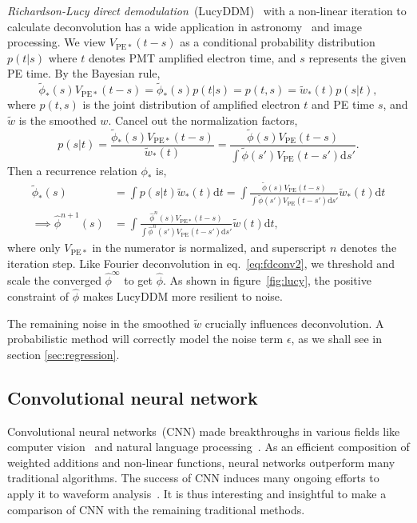 \textit{Richardson-Lucy direct demodulation}~(LucyDDM)~\cite{lucy_iterative_1974} with a non-linear iteration to calculate deconvolution has a wide application in astronomy~\cite{li_richardson-lucy_2019} and image processing. We view $V_{\mathrm{PE}*}(t-s)$ as a conditional probability distribution $p(t|s)$ where $t$ denotes PMT amplified electron time, and $s$ represents the given PE time. By the Bayesian rule,
\begin{equation}
  \label{eq:lucy}
  \tilde{\phi}_*(s) V_{\mathrm{PE}*}(t-s) = \tilde{\phi}_*(s)p(t|s) = p(t,s) = \tilde{w}_*(t)p(s|t),
\end{equation}
where $p(t, s)$ is the joint distribution of amplified electron $t$ and PE time $s$, and $\tilde{w}$ is the smoothed $w$.  Cancel out the normalization factors,
\begin{equation}
  \label{eq:ptt}
  p(s|t) = \frac{\tilde{\phi}_*(s) V_{\mathrm{PE}*}(t-s)}{\tilde{w}_*(t)} = \frac{\tilde{\phi}(s) V_{\mathrm{PE}}(t-s)}{\int\tilde{\phi}(s') V_{\mathrm{PE}}(t-s')\mathrm{d}s'}.
\end{equation}
Then a recurrence relation $\phi_*$ is,
\begin{equation}
  \label{eq:iter}
  \begin{aligned}
    \tilde{\phi}_*(s) & = \int p(s|t) \tilde{w}_*(t)\mathrm{d}t = \int \frac{\tilde{\phi}(s) V_{\mathrm{PE}}(t-s)}{\int\tilde{\phi}(s') V_{\mathrm{PE}}(t-s')\mathrm{d}s'} \tilde{w}_*(t) \mathrm{d}t \\
    \implies \hat{\phi}^{n+1}(s) & = \int \frac{\hat{\phi}^n(s) V_{\mathrm{PE}*}(t-s)}{\int\hat{\phi}^n(s') V_{\mathrm{PE}}(t-s')\mathrm{d}s'} \tilde{w}(t) \mathrm{d}t,
  \end{aligned}
\end{equation}
where only $V_{\mathrm{PE}*}$ in the numerator is normalized, and superscript $n$ denotes the iteration step.
Like Fourier deconvolution in eq.~\eqref{eq:fdconv2}, we threshold and scale the converged $\hat{\phi}^\infty$ to get $\hat{\phi}$.  As shown in figure~\ref{fig:lucy}, the positive constraint of $\hat{\phi}$ makes LucyDDM more resilient to noise.

The remaining noise in the smoothed $\tilde{w}$ crucially influences deconvolution.  A probabilistic method will correctly model the noise term $\epsilon$, as we shall see in section \ref{sec:regression}.

\subsection{Convolutional neural network}
\label{sec:cnn}
Convolutional neural networks~(CNN) made breakthroughs in various fields like computer vision~\cite{he_deep_2016} and natural language processing~\cite{vaswani_attention_2017}.  As an efficient composition of weighted additions and non-linear functions, neural networks outperform many traditional algorithms.  The success of CNN induces many ongoing efforts to apply it to waveform analysis~\cite{students22}.  It is thus interesting and insightful to make a comparison of CNN with the remaining traditional methods.


